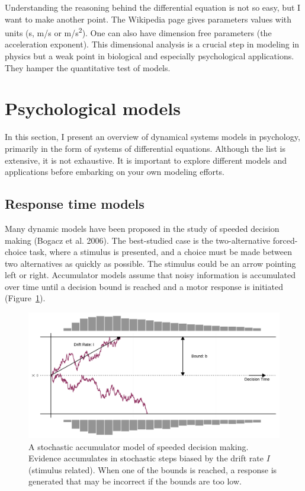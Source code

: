 \documentclass[
  a4paper,
  DIV=11,
  numbers=noendperiod,
  oneside]{scrreprt}
\begin{document}
Understanding the reasoning behind the differential equation is not so
easy, but I want to make another point. The Wikipedia page gives
parameters values with units (s, m/s or m/s\textsuperscript{2}). One can
also have dimension free parameters (the acceleration exponent). This
dimensional analysis is a crucial step in modeling in physics but a weak
point in biological and especially psychological applications. They
hamper the quantitative test of models.

\hypertarget{sec-Psychological-models}{%
\section{Psychological models}\label{sec-Psychological-models}}

In this section, I present an overview of dynamical systems models in
psychology, primarily in the form of systems of differential equations.
Although the list is extensive, it is not exhaustive. It is important to
explore different models and applications before embarking on your own
modeling efforts.

\hypertarget{sec-Response-time-models}{%
\subsection{Response time models}\label{sec-Response-time-models}}

Many dynamic models have been proposed in the study of speeded decision
making (Bogacz et al. 2006). The best-studied case is the
two-alternative forced-choice task, where a stimulus is presented, and a
choice must be made between two alternatives as quickly as possible. The
stimulus could be an arrow pointing left or right. Accumulator models
assume that noisy information is accumulated over time until a decision
bound is reached and a motor response is initiated
(Figure~\ref{fig-ch4n-img7-old-55}).

\begin{figure}

{\centering \includegraphics{media/ch4n/fig-ch4n-img7-old-55.png}

}

\caption{\label{fig-ch4n-img7-old-55}A stochastic accumulator model of
speeded decision making. Evidence accumulates in stochastic steps biased
by the drift rate \(I\) (stimulus related). When one of the bounds is
reached, a response is generated that may be incorrect if the bounds are
too low.}

\end{figure}
\end{document}
